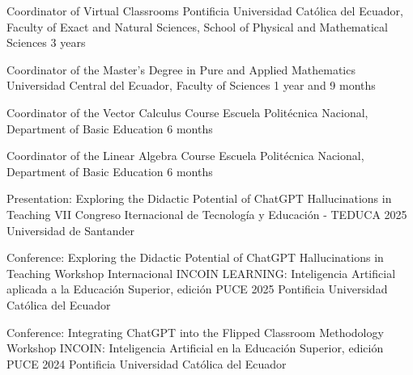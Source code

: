 \documentclass[
    a4paper,
    maincolor=cvblue!70!blue,
    sidecolor=gray!30,
    sectioncolor=cvblue!70!blue,
    sidebarwidth=7.5cm,
    topbottommargin=20pt,
    leftrightmargin=20pt,
]{fortysecondscv}
\begin{document}
    {Coordinator of Virtual Classrooms}
    {Pontificia Universidad Católica del Ecuador, Faculty of Exact and Natural Sciences, School of Physical and Mathematical Sciences}
    {3 years}
    
    {Coordinator of the Master's Degree in Pure and Applied Mathematics}
    {Universidad Central del Ecuador, Faculty of Sciences}
    {1 year and 9 months}
    
    {Coordinator of the Vector Calculus Course}
    {Escuela Politécnica Nacional, Department of Basic Education}
    {6 months}
    
    {Coordinator of the Linear Algebra Course}
    {Escuela Politécnica Nacional, Department of Basic Education}
    {6 months}
    



\newpage
{}




    {Presentation: Exploring the Didactic Potential of ChatGPT Hallucinations in Teaching}
    {VII Congreso Iternacional de Tecnología y Educación - TEDUCA 2025}
    {Universidad de Santander}

    {Conference: Exploring the Didactic Potential of ChatGPT Hallucinations in Teaching}
    {Workshop Internacional INCOIN LEARNING: Inteligencia Artificial aplicada a la Educación Superior, edición PUCE 2025}
    {Pontificia Universidad Católica del Ecuador}
    
    {Conference: Integrating ChatGPT into the Flipped Classroom Methodology}
    {Workshop INCOIN: Inteligencia Artificial en la Educación Superior, edición PUCE 2024}
    {Pontificia Universidad Católica del Ecuador}
    
\end{document}
